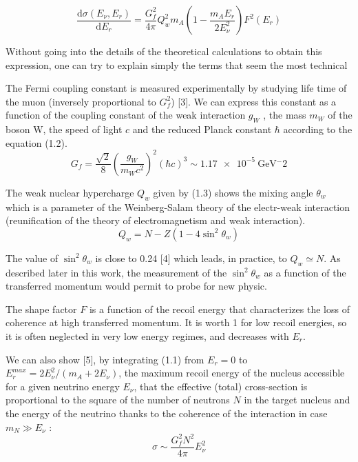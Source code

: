 \begin{equation}
\frac{\mathrm{d} \sigma (E_{\nu}, E_r)}{\mathrm{d} E_r}
=
\frac{G_{f}^2}{4\pi}
Q_w^2  m_A
\left( 1 - \frac{m_A E_r}{2 E_{\nu}^2} \right)
F^2(E_r)
\end{equation}

Without going into the details of the theoretical calculations to obtain this expression, one can try to explain simply the terms that seem the most technical

The Fermi coupling constant is measured experimentally by studying life time of the muon (inversely proportional to $G_f^2$) [3]. We can express this constant as a function of the coupling constant of the weak interaction $g_W$ , the mass $m_W$ of the boson W, the speed of light $c$ and the reduced Planck constant $\hbar$ according to the equation (1.2).
\begin{equation}
G_f 
=
\frac{\sqrt{2}}{8}
\left( \frac{g_W}{m_W c^2} \right)^2
(\hbar c)^3
\sim \SI{1.17e-5}{\giga \eV^-2}
\end{equation}

The weak nuclear hypercharge $Q_w$ given by (1.3) shows the mixing angle $\theta_w$ which is a parameter of the Weinberg-Salam theory of the electr-weak interaction (reunification of the theory of electromagnetism and weak interaction).
\begin{equation}
Q_w = N - Z (1 - 4 \sin^2 \theta_w)
\end{equation}

The value of $\sin^2 \theta_w$ is close to 0.24 [4] which leads, in practice, to $Q_w \simeq N$. As described later in this work, the measurement of the $\sin^2 \theta_w$ as a function of the transferred momentum would permit to probe for new physic.

The shape factor $F$ is a function of the recoil energy that characterizes the loss of coherence at high transferred momentum. It is worth 1 for low recoil energies, so it is often neglected in very low energy regimes, and decreases with $E_r$.

We can also show [5], by integrating (1.1) from $E_r = 0$ to $E_r^{max} = 2E_{\nu}^2 / (m_A + 2E_{\nu} )$, the maximum recoil energy of the nucleus accessible for a given neutrino energy $E_{\nu}$, that the effective (total) cross-section is proportional to the square of the number of neutrons $N$ in the target nucleus and the energy of the neutrino thanks to the coherence of the interaction in case $m_N \gg E_{\nu}$ :
\begin{equation}
\sigma
\sim
\frac{G_f^2 N^2}{4\pi} E_{\nu}^2
\end{equation}

